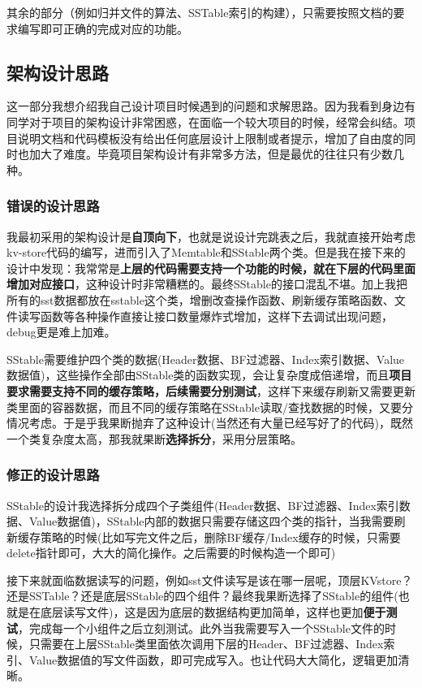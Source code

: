\documentclass[fontset=windows]{article}
\begin{document}
其余的部分（例如归并文件的算法、SSTable索引的构建），只需要按照文档的要求编写即可正确的完成对应的功能。

\subsection{架构设计思路}

这一部分我想介绍我自己设计项目时候遇到的问题和求解思路。因为我看到身边有同学对于项目的架构设计非常困惑，在面临一个较大项目的时候，经常会纠结。项目说明文档和代码模板没有给出任何底层设计上限制或者提示，增加了自由度的同时也加大了难度。毕竟项目架构设计有非常多方法，但是最优的往往只有少数几种。

\subsubsection{错误的设计思路}
我最初采用的架构设计是\textbf{自顶向下}，也就是说设计完跳表之后，我就直接开始考虑kv-store代码的编写，进而引入了Memtable和SStable两个类。但是我在接下来的设计中发现：我常常是\textbf{上层的代码需要支持一个功能的时候，就在下层的代码里面增加对应接口}，这种设计时非常糟糕的。最终SStable的接口混乱不堪。加上我把所有的sst数据都放在sstable这个类，增删改查操作函数、刷新缓存策略函数、文件读写函数等各种操作直接让接口数量爆炸式增加，这样下去调试出现问题，debug更是难上加难。

SStable需要维护四个类的数据(Header数据、BF过滤器、Index索引数据、Value数据值)，这些操作全部由SStable类的函数实现，会让复杂度成倍递增，而且\textbf{项目要求需要支持不同的缓存策略，后续需要分别测试}，这样下来缓存刷新又需要更新类里面的容器数据，而且不同的缓存策略在SStable读取/查找数据的时候，又要分情况考虑。于是乎我果断抛弃了这种设计(当然还有大量已经写好了的代码)，既然一个类复杂度太高，那我就果断\textbf{选择拆分}，采用分层策略。

\subsubsection{修正的设计思路}
SStable的设计我选择拆分成四个子类组件(Header数据、BF过滤器、Index索引数据、Value数据值)，SStable内部的数据只需要存储这四个类的指针，当我需要刷新缓存策略的时候(比如写完文件之后，删除BF缓存/Index缓存的时候，只需要delete指针即可，大大的简化操作。之后需要的时候构造一个即可)

接下来就面临数据读写的问题，例如sst文件读写是该在哪一层呢，顶层KVstore？还是SSTable？还是底层SStable的四个组件？最终我果断选择了SStable的组件(也就是在底层读写文件)，这是因为底层的数据结构更加简单，这样也更加\textbf{便于测试}，完成每一个小组件之后立刻测试。此外当我需要写入一个SStable文件的时候，只需要在上层SStable类里面依次调用下层的Header、BF过滤器、Index索引、Value数据值的写文件函数，即可完成写入。也让代码大大简化，逻辑更加清晰。
\end{document}
